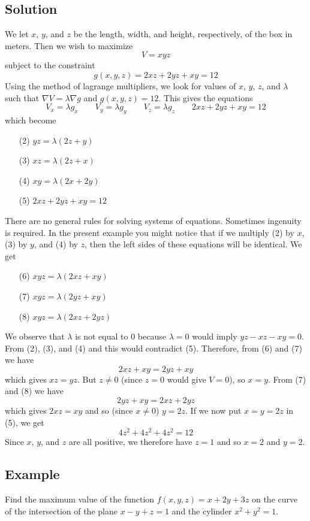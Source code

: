 \subsection*{Solution}
We let $x$, $y$, and $z$ be the length, width, and height, respectively, of the box in
meters. Then we wish to maximize
$$V=xyz$$
subject to the constraint
$$g(x,y,z)=2xz+2yz+xy=12$$
Using the method of lagrange multipliers, we look for values of $x$, $y$, $z$,
and $\lambda$ such that $\nabla V= \lambda\nabla g$ and $g(x, y, z) = 12$. This gives the equations
$$V_x=\lambda g_x \qquad V_y=\lambda g_y \qquad V_z=\lambda g_z \qquad 2xz+2yz+xy=12$$
which become
\begin{enumerate}
    \item[(2)] $yz=\lambda(2z+y)$
    \item[(3)] $xz=\lambda(2z+x)$
    \item[(4)] $xy=\lambda(2x+2y)$
    \item[(5)] $2xz+2yz+xy=12$
\end{enumerate}
There are no general rules for solving systems of equations. Sometimes ingenuity
is required. In the present example you might notice that if we multiply (2)
by $x$, (3) by $y$, and (4) by $z$, then the left sides of these equations will be
identical. We get
\begin{enumerate}
    \item[(6)] $xyz=\lambda(2xz+xy)$
    \item[(7)] $xyz=\lambda(2yz+xy)$
    \item[(8)] $xyz=\lambda(2xz+2yz)$
\end{enumerate}
We observe that $\lambda$ is  not equal to 0 because $\lambda = 0$ would imply
$yz - xz - xy = 0$. From (2), (3), and (4) and this would contradict (5).
Therefore, from (6) and (7) we have
$$2xz+xy=2yz+xy$$
which gives $xz=yz$. But $z\neq 0$ (since $z=0$ would give $V=0$), so $x=y$.
From (7) and (8) we have
$$2yz+xy=2xz+2yz$$
which gives $2xz=xy$ and so (since $x\neq 0$) $y=2z$. If we now put $x=y=2z$ in (5), we get
$$4z^2+4z^2+4z^2=12$$
Since $x$, $y$, and $z$ are all positive, we therefore have $z=1$ and so $x=2$ and $y=2$.

\subsection*{Example}
Find the maximum value of the function $f(x,y,z)=x+2y+3z$ on the curve of the
intersection of the plane $x-y+z=1$ and the cylinder $x^2+y^2=1$.

